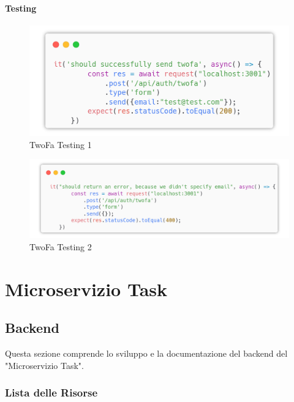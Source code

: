 \documentclass{report}
\begin{document}
\subsubsection*{Testing}
\begin{figure}[H]
	\centering\includegraphics[width=1\textwidth]{images/microservizio-autenticazione/tests/twofa_test_1.png}
	\caption{TwoFa Testing 1}
\end{figure}
\begin{figure}[H]
	\centering\includegraphics[width=1\textwidth]{images/microservizio-autenticazione/tests/twofa_test_2.png}
	\caption{TwoFa Testing 2}
\end{figure}






\chapter{Microservizio Task}

\section{Backend}

Questa sezione comprende lo sviluppo e la documentazione del backend del
"Microservizio Task". 

\subsection{Lista delle Risorse}
\end{document}
